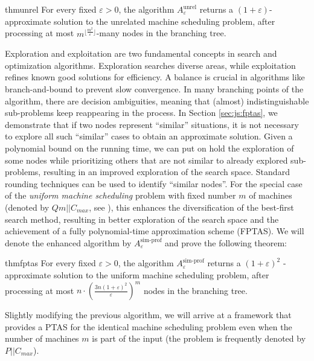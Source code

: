 \documentclass[moor,sglanonrev]{informs4}
\theoremstyle{plain}
\begin{document}
\begin{restatable*}{thm}{unrel}\label{unrel_machine_ptas}
    For every fixed $\varepsilon > 0$, the algorithm $A^{\text{unrel}}_{\varepsilon}$ returns a $(1+\varepsilon)$-approximate solution to the unrelated machine scheduling problem, after processing at most $m^{\lfloor\frac{m^2}{\varepsilon}\rfloor}$-many nodes in the branching tree.
\end{restatable*}

Exploration and exploitation are two fundamental concepts in search and optimization algorithms. Exploration searches diverse areas, while exploitation refines known good solutions for efficiency. A balance is crucial in algorithms like branch-and-bound to prevent slow convergence. In many branching points of the algorithm, there are decision ambiguities, meaning that (almost) indistinguishable sub-problems keep reappearing in the process. In Section \ref{sec:js:fptas}, we demonstrate that if two nodes represent ``similar'' situations, it is not necessary to explore all such ``similar'' cases to obtain an approximate solution. Given a polynomial bound on the running time, we can put on hold the exploration of some nodes while prioritizing others that are not similar to already explored sub-problems, resulting in an improved exploration of the search space. Standard rounding techniques can be used to identify ``similar nodes''. For the special case of the \emph{uniform machine scheduling} problem with fixed number $m$ of machines (denoted by $Qm||C_{max}$, see \cite{machine_scheduling_review}), this enhances the diversification of the best-first search method, resulting in better exploration of the search space and the achievement of a fully polynomial-time approximation scheme (FPTAS). We will denote the enhanced algorithm by $A^{\text{sim-prof}}_{\varepsilon}$ and prove the following theorem:

\begin{restatable*}{thm}{fptas}\label{fptas}
    For every fixed $\varepsilon > 0$, the algorithm $A^{\text{sim-prof}}_{\varepsilon}$ returns a $(1+\varepsilon)^2$ - approximate solution to the uniform machine scheduling problem, after processing at most $n\cdot \left(\frac{3n(1+\varepsilon)^2}{\varepsilon}\right)^m$ nodes in the branching tree.
\end{restatable*}

Slightly modifying the previous algorithm, we will arrive at a framework that provides a PTAS for the identical machine scheduling problem even when the number of machines $m$ is part of the input (the problem is frequently denoted by $P||C_{max}$).
\end{document}
